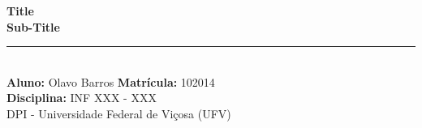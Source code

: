 \documentclass[12pt,a4paper]{article}
\begin{document}
\begin{center}
    {\LARGE \textbf{Title}}\\[0.5em]
    {\large \textbf{Sub-Title}}\\[1em]
    \textcolor{gray}{\rule{\textwidth}{1pt}}\\[1em]
    \textbf{Aluno:} Olavo Barros \quad \textbf{Matrícula:} 102014\\[0.5em]
    \textbf{Disciplina:} INF XXX - XXX \\[0.5em]
    DPI - Universidade Federal de Viçosa (UFV)
\end{center}
\vspace{1.5em}


\end{document}
